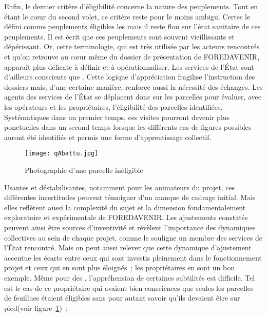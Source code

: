 \documentclass[12pt]{report}
\begin{document}
Enfin, le dernier critère d’éligibilité concerne la nature des peuplements. Tout
en étant le c\oe{}ur du second volet, ce critère reste pour le moins ambigu.
Certes le~\citet{instructionTech_ref109}
défini comme peuplements éligibles les  mais il reste flou sur l'état
sanitaire de ces peuplements. Il est écrit que ces
peuplements sont souvent vieillissants et dépérissant. Or, cette terminologie,
qui est très utilisée par les acteurs rencontrés et qu’on retrouve au cœur même
du dossier de présentation de FOREDAVENIR, apparaît plus délicate à définir et
à opérationnaliser. Les services de l’État sont d’ailleurs conscients que
. Cette logique d’appréciation
fragilise l’instruction des dossiers mais, d’une certaine manière, renforce aussi
la nécessité des échanges. Les agents des services de l’État se déplacent donc
sur les parcelles pour évaluer, avec les opérateurs et les propriétaires,
l’éligibilité des parcelles identifiées. Systématiques dans un premier temps,
ces visites pourront devenir plus ponctuelles dans un second temps lorsque les
différents cas de figures possibles auront été identifiés et permis une forme
d’apprentissage collectif.\\

\begin{figure}[t]
  \centering
  \texttt{[image: qAbattu.jpg]}
  \caption{Photographie d'une parcelle inéligible}\label{fig:ineligible}
\end{figure}

Usantes et déstabilisantes, notamment pour les animateurs du projet, ces
différentes incertitudes peuvent témoigner d’un manque de cadrage initial. Mais
elles reflètent aussi la complexité du sujet et la dimension fondamentalement
exploratoire et expérimentale de FOREDAVENIR. Les ajustements constatés
peuvent ainsi être sources d’inventivité et révèlent l’importance des dynamiques
collectives au sein de chaque projet, comme le souligne un membre des services
de l’État rencontré. Mais on peut aussi relever que cette dynamique d’ajustement
accentue les écarts entre ceux qui sont investis pleinement dans le fonctionnement
projet et ceux qui en sont plus éloignés~; les propriétaires en sont un bon
exemple. Même pour
des , l’appréhension  de certaines
subtilités est difficile. Tel est le cas de ce propriétaire qui avaient bien
consciences que seules les parcelles de feuillues étaient éligibles sans pour
autant savoir qu'ils devaient être sur pied(voir figure~\ref{fig:ineligible})~:
\end{document}
